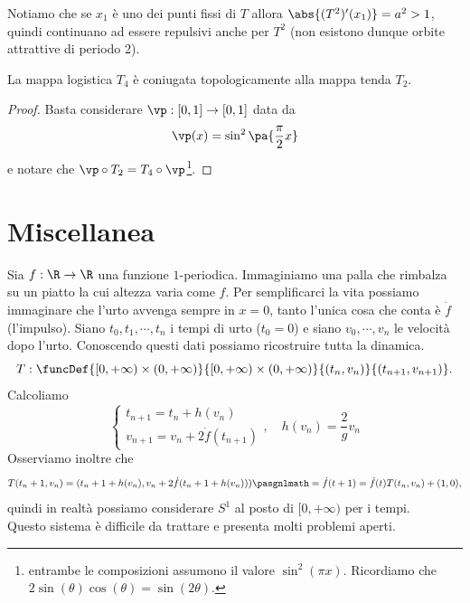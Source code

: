 \begin{example}
\begin{itemize}
Notiamo che se $x_1$ \`e uno dei punti fissi di $T$ allora $\abs{(T^2)'(x_1)}=a^2>1$, quindi continuano ad essere repulsivi anche per $T^2$ (non esistono dunque orbite attrattive di periodo 2).
\end{itemize}
\setlength{\leftmargini}{0.5cm}
\end{example}
    
\begin{remark}
La mappa logistica $T_4$ \`e coniugata topologicamente alla mappa tenda $T_2$.
\end{remark}
\begin{proof}
Basta considerare $\vp:[0,1]\to [0,1]$ data da
\[\vp(x)=\sin^2\pa{\frac\pi2x}\]
e notare che $\vp\circ T_2=T_4\circ \vp$\footnote{entrambe le composizioni assumono il valore $\sin^2(\pi x)$. Ricordiamo che $2\sin(\theta)\cos(\theta)=\sin(2\theta)$.}.
\end{proof}

\section{Miscellanea}
\begin{example}
Sia $f:\R\to \R$ una funzione $1$-periodica. Immaginiamo una palla che rimbalza su un piatto la cui altezza varia come $f$. Per semplificarci la vita possiamo immaginare che l'urto avvenga sempre in $x=0$, tanto l'unica cosa che conta \`e $\dot f$ (l'impulso). Siano $t_0,t_1,\cdots,t_n$ i tempi di urto ($t_0=0$) e siano $v_0,\cdots,v_n$ le velocit\`a dopo l'urto. Conoscendo questi dati possiamo ricostruire tutta la dinamica.
\[T:\funcDef{[0,+\infty)\times (0,+\infty)}{[0,+\infty)\times (0,+\infty)}{(t_{n},v_n)}{(t_{n+1},v_{n+1})}.\]
Calcoliamo
\[\begin{cases}
t_{n+1}=t_n+h(v_n)\\
v_{n+1}=v_n+2\dot f(t_{n+1})
\end{cases},\quad h(v_n)=\frac 2gv_n\]
Osserviamo inoltre che
\[T(t_n+1,v_n)=(t_n+1+h(v_n), v_n+2\dot f(t_n+1+ h(v_n)))\pasgnlmath={\dot f(t+1)=\dot f(t)}T(t_n,v_n)+(1,0),\]
quindi in realt\`a possiamo considerare $S^1$ al posto di $[0,+\infty)$ per i tempi.\\
Questo sistema \`e difficile da trattare e presenta molti problemi aperti.
\end{example}

